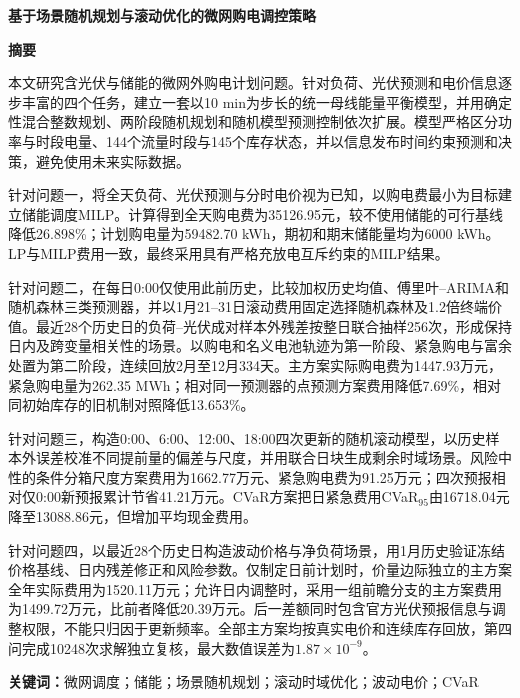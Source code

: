 \begin{center}
  {\bfseries 基于场景随机规划与滚动优化的微网购电调控策略\par}
  \vspace{1.2em}
  {\bfseries 摘要}
\end{center}

本文研究含光伏与储能的微网外购电计划问题。针对负荷、光伏预测和电价信息逐步丰富的四个任务，建立一套以10 min为步长的统一母线能量平衡模型，并用确定性混合整数规划、两阶段随机规划和随机模型预测控制依次扩展。模型严格区分功率与时段电量、144个流量时段与145个库存状态，并以信息发布时间约束预测和决策，避免使用未来实际数据。

针对问题一，将全天负荷、光伏预测与分时电价视为已知，以购电费最小为目标建立储能调度MILP。计算得到全天购电费为35126.95元，较不使用储能的可行基线降低26.898\%；计划购电量为59482.70 kWh，期初和期末储能量均为6000 kWh。LP与MILP费用一致，最终采用具有严格充放电互斥约束的MILP结果。

针对问题二，在每日0:00仅使用此前历史，比较加权历史均值、傅里叶--ARIMA和随机森林三类预测器，并以1月21--31日滚动费用固定选择随机森林及1.2倍终端价值。最近28个历史日的负荷--光伏成对样本外残差按整日联合抽样256次，形成保持日内及跨变量相关性的场景。以购电和名义电池轨迹为第一阶段、紧急购电与富余处置为第二阶段，连续回放2月至12月334天。主方案实际购电费为1447.93万元，紧急购电量为262.35 MWh；相对同一预测器的点预测方案费用降低7.69\%，相对同初始库存的旧机制对照降低13.653\%。

针对问题三，构造0:00、6:00、12:00、18:00四次更新的随机滚动模型，以历史样本外误差校准不同提前量的偏差与尺度，并用联合日块生成剩余时域场景。风险中性的条件分箱尺度方案费用为1662.77万元、紧急购电费为91.25万元；四次预报相对仅0:00新预报累计节省41.21万元。CVaR方案把日紧急费用CVaR$_{95}$由16718.04元降至13088.86元，但增加平均现金费用。

针对问题四，以最近28个历史日构造波动价格与净负荷场景，用1月历史验证冻结价格基线、日内残差修正和风险参数。仅制定日前计划时，价量边际独立的主方案全年实际费用为1520.11万元；允许日内调整时，采用一组前瞻分支的主方案费用为1499.72万元，比前者降低20.39万元。后一差额同时包含官方光伏预报信息与调整权限，不能只归因于更新频率。全部主方案均按真实电价和连续库存回放，第四问完成10248次求解独立复核，最大数值误差为$1.87\times10^{-9}$。

\vspace{0.8em}
\noindent\textbf{关键词：}微网调度；储能；场景随机规划；滚动时域优化；波动电价；CVaR
